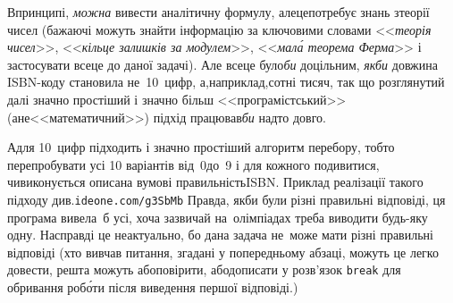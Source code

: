 {
\Tutorial	
В\nolinebreak[3] принципі, \emph{можна} вивести аналітичну формулу, але\nolinebreak[3] це\nolinebreak[3] потребує знань з\nolinebreak[3] теорії чисел (бажаючі можуть знайти інформацію за ключовими словами <<\emph{теорія чисел}>>, <<\emph{кільце залишків за модулем}>>, <<\emph{мал\'{а} теорема Ферма}>> і застосувати все\nolinebreak[3] це до даної задачі). Але все\nolinebreak[3] це було\nolinebreak[3] \emph{би} доцільним, \emph{якби} довжина ISBN-коду становила не~10~цифр, а,\nolinebreak[3] наприклад,\nolinebreak[3] сотні тисяч, так що розглянутий далі значно простіший і значно більш <<програмістський>> (а\nolinebreak[3] не\nolinebreak[3] <<математичний>>) підхід працював\nolinebreak[3] \emph{би} надто довго.

А\nolinebreak[3] для 10~цифр підходить і значно простіший алгоритм перебору, тобто перепробувати усі 10 варіантів від~0\nolinebreak[1] до~9 і для кожного подивитися, чи\nolinebreak[3] виконується описана в\nolinebreak[3] умові правильність\nolinebreak[3] ISBN. Приклад реалізації такого підходу див.\nolinebreak[1] \verb"ideone.com/g3SbMb"\hspace{0.5em plus 1em} Правда, якби були різні правильні відповіді, ця програма вивела~б усі, хоча зазвичай на~олімпіадах треба виводити будь-яку одну. Насправді це неактуально, бо дана задача не~може мати різні правильні відповіді (хто вивчав питання, згадані у попередньому абзаці, можуть це легко довести, решта можуть або\nolinebreak[3] повірити, або\nolinebreak[3] дописати у розв'язок \verb"break" для обривання роб\'{о}ти після виведення першої відповіді.)

}
